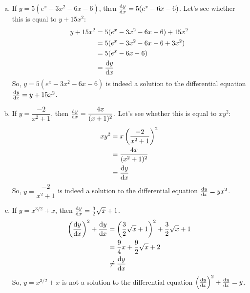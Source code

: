 \begin{solution}
\begin{enumerate}[(a)]
\item If $y=5(e^x-3x^2-6x-6)$, then $\diff{y}{x} = 5(e^x-6x-6)$. Let's see whether this is equal to $y+15x^2$:
\begin{align*}
y+15x^2&=5(e^x-3x^2-6x-6)+15x^2\\
&=5(e^x-3x^2-6x-6+3x^2)\\
&=5(e^x-6x-6)\\
&=\diff{y}{x}
\end{align*}
So, $y=5(e^x-3x^2-6x-6)$ is indeed a solution to the differential equation $\diff{y}{x}=y+15x^2$.
%
\item If $y=\dfrac{-2}{x^2+1}$, then  $\diff{y}{x} = \dfrac{4x}{(x+1)^2}$. Let's see whether this is equal to $xy^2$:
\begin{align*}
xy^2&=x\left(\frac{-2}{x^2+1}\right)^2\\
&=\frac{4x}{(x^2+1)^2}\\
&=\diff{y}{x}
\end{align*}
So, $y=\dfrac{-2}{x^2+1}$ is indeed a solution to the differential equation $\diff{y}{x}=yx^2$.
%
\item If $y=x^{3/2}+x$, then  $\diff{y}{x} = \frac{3}{2}\sqrt{x}+1$.
\begin{align*}
\left(\diff{y}{x}\right)^2+\diff{y}{x}&=\left(\frac{3}{2}\sqrt{x}+1\right)^2+\frac{3}{2}\sqrt{x}+1\\
&=\frac{9}{4}x+\frac{9}{2}\sqrt{x}+2\\
&\neq \diff{y}{x}
\end{align*}
So, $y=x^{3/2}+x$ is not a solution to the differential equation $\left(\diff{y}{x}\right)^2+\diff{y}{x}=y$.
\end{enumerate}
\end{solution}


